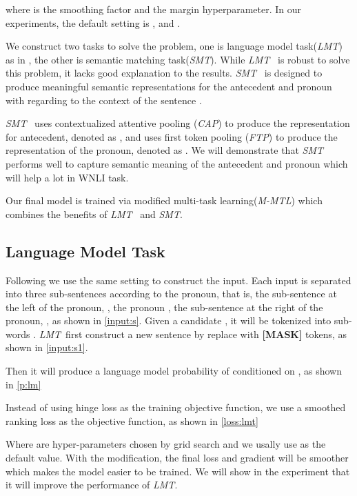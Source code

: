 \documentclass[11pt,a4paper]{article}
\newcommand{\lmt}{\textit{LMT}}
\newcommand{\smt}{\textit{SMT}}
\newcommand{\mmt}{\textit{M-MTL}}
\begin{document}
where  is the smoothing factor and  the margin hyperparameter. In our experiments, the default setting is , and .

\iffalse
We construct two tasks to solve the problem, one is language model task(\lmt) as in \cite{kocijan2019surprisingly}, the other is semantic matching task(\smt). 
While \lmt~ is robust to solve this problem, it lacks good explanation to the results. \smt~ is designed to produce meaningful semantic representations for the antecedent  and pronoun  with regarding to the context of the sentence .

\smt~ uses contextualized attentive pooling (\textit{CAP}) to produce the representation for antecedent, denoted as , and uses first token pooling (\textit{FTP}) to produce the representation of the pronoun, denoted as  . We will demonstrate that \smt~ performs well to capture semantic meaning of the antecedent and pronoun which will help a lot in WNLI task.



Our final model is trained via modified multi-task learning(\mmt) which combines the benefits of \lmt~ and \smt. 

\subsection{Language Model Task}
\label{sec:lmt}
Following \cite{kocijan2019surprisingly} we use the same setting to construct the input. Each input  is separated into three sub-sentences according to the pronoun, that is, the sub-sentence at the left of the pronoun, , the pronoun , the sub-sentence at the right of the pronoun, , as shown in \eqref{input:s}. 
Given a candidate , it will be tokenized into  sub-words . \lmt~first construct a new sentence  by replace  with  \textbf{[MASK]} tokens, as shown in \eqref{input:s1}. 





Then it will produce a language model probability of  conditioned on , as shown in \eqref{p:lm}



Instead of using hinge loss as the training objective function, we use a smoothed ranking loss as the objective function, as shown in \eqref{loss:lmt}



Where  are hyper-parameters chosen by grid search and we usally use  as the default value. With the modification, the final loss and gradient will be smoother which makes the model easier to be trained. We will show in the experiment that it will improve the performance of \lmt.
\end{document}
